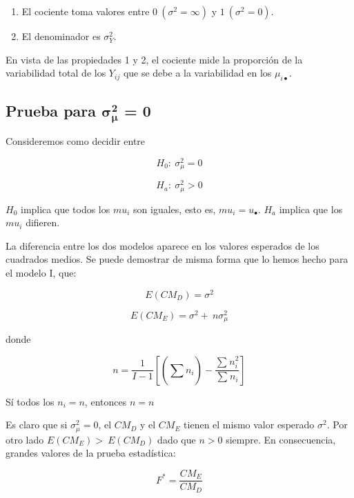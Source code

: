 \documentclass[]{book}
\theoremstyle{definition}
\theoremstyle{definition}
\theoremstyle{definition}
\theoremstyle{remark}
\begin{document}
\begin{enumerate}
\def\labelenumi{\arabic{enumi}.}
\item
  El cociente toma valores entre \(0\ (\sigma^{2} = \infty)\) y \(1\
  (\sigma^{2} = 0)\).
\item
  El denominador es \(\sigma_{Y}^{2}\).
\end{enumerate}

En vista de las propiedades 1 y 2, el cociente mide la proporción de la
variabilidad total de los \(Y_{ij}\) que se debe a la variabilidad en
los \(\mu_{i\bullet}\).

\hypertarget{prueba-para-mathbfsigma_mathbfmumathbf2-0}{%
\subsection{\texorpdfstring{Prueba para
\(\mathbf{\sigma}_{\mathbf{\mu}}^{\mathbf{2}}\) =
0}{Prueba para \textbackslash{}mathbf\{\textbackslash{}sigma\}\_\{\textbackslash{}mathbf\{\textbackslash{}mu\}\}\^{}\{\textbackslash{}mathbf\{2\}\} = 0}}\label{prueba-para-mathbfsigma_mathbfmumathbf2-0}}

Consideremos como decidir entre

\[
H_{0}:\ \sigma_{\mu}^{2} = 0
\]

\[
H_{a}:\ \sigma_{\mu}^{2} > 0
\]

\(H_{0}\) implica que todos los \(mu_{i}\) son iguales, esto es,
\(mu_{i} = u_{\bullet}\). \(H_{a}\) implica que los \(mu_{i}\) difieren.

La diferencia entre los dos modelos aparece en los valores esperados de
los cuadrados medios. Se puede demostrar de misma forma que lo hemos
hecho para el modelo I, que:

\[
E(CM_D) = \sigma^{2}
\]

\[
E\left( CM_E \right) = \sigma^{2} + \ n\sigma_{\mu}^{2}
\]

donde

\[
n = \frac{1}{I - 1}\left\lbrack \left( \sum_{}^{}n_{i} \right) - \frac{\sum_{}^{}n_{i}^{2}}{\sum_{}^{}n_{i}} \right\rbrack
\]

Sí todos los \(n_{i} = n\), entonces \(n = n\)

Es claro que si \(\sigma_{\mu}^{2} = 0\), el \(CM_D\) y el \(CM_E\)
tienen el mismo valor esperado \(\sigma^{2}\). Por otro lado
\(E\left( CM_E \right) > \ E(CM_D)\) dado que \(n > 0\) siempre. En
consecuencia, grandes valores de la prueba estadística:

\[
F^{*} = \frac{CM_E}{CM_D}
\]
\end{document}
